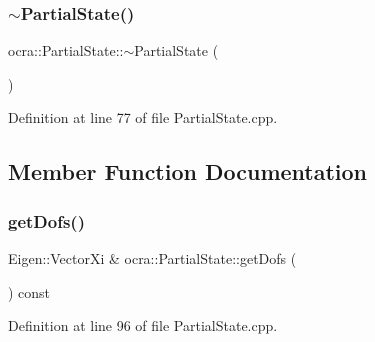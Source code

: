 \hypertarget{classocra_1_1PartialState_a6426dc8cd115e310f16f0d244802618f}{}\label{classocra_1_1PartialState_a6426dc8cd115e310f16f0d244802618f} 
\subsubsection{\texorpdfstring{$\sim$\+Partial\+State()}{~PartialState()}}
{\footnotesize\ttfamily ocra\+::\+Partial\+State\+::$\sim$\+Partial\+State (\begin{DoxyParamCaption}{ }\end{DoxyParamCaption})\hspace{0.3cm}{\ttfamily [pure virtual]}}



Definition at line 77 of file Partial\+State.\+cpp.



\subsection{Member Function Documentation}
\hypertarget{classocra_1_1PartialState_a969bb0d941f73df7da78aba4339908c4}{}\label{classocra_1_1PartialState_a969bb0d941f73df7da78aba4339908c4} 
\subsubsection{\texorpdfstring{get\+Dofs()}{getDofs()}}
{\footnotesize\ttfamily Eigen\+::\+Vector\+Xi \& ocra\+::\+Partial\+State\+::get\+Dofs (\begin{DoxyParamCaption}{ }\end{DoxyParamCaption}) const\hspace{0.3cm}{\ttfamily [protected]}}



Definition at line 96 of file Partial\+State.\+cpp.

\hypertarget{classocra_1_1PartialState_ad811a25932f0fad439242ebd48841162}{}\label{classocra_1_1PartialState_ad811a25932f0fad439242ebd48841162} 
